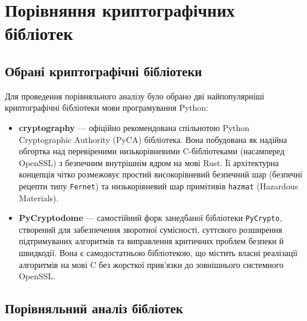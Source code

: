 \section{Порівняння криптографічних бібліотек}

\subsection{Обрані криптографічні бібліотеки}

Для проведення порівняльного аналізу було обрано дві найпопулярніші криптографічні бібліотеки мови програмування Python:
\begin{itemize}
    \item \textbf{cryptography} \cite{cryptography, cryptography git} --- офіційно рекомендована спільнотою Python Cryptographic Authority (PyCA) бібліотека. Вона побудована як надійна обгортка над перевіреними низькорівневими C-бібліотеками (насамперед OpenSSL) з безпечним внутрішнім ядром на мові Rust. Її архітектурна концепція чітко розмежовує простий високорівневий безпечний шар (безпечні рецепти типу \texttt{Fernet}) та низькорівневий шар примітивів \texttt{hazmat} (Hazardous Materials).
    \item \textbf{PyCryptodome} \cite{PyCryptodome, PyCryptodome git} --- самостійний форк занедбаної бібліотеки \texttt{PyCrypto}, створений для забезпечення зворотної сумісності, суттєвого розширення підтримуваних алгоритмів та виправлення критичних проблем безпеки й швидкодії. Вона є самодостатньою бібліотекою, що містить власні реалізації алгоритмів на мові C без жорсткої прив'язки до зовнішнього системного OpenSSL.
\end{itemize}

\subsection{Порівняльний аналіз бібліотек}

